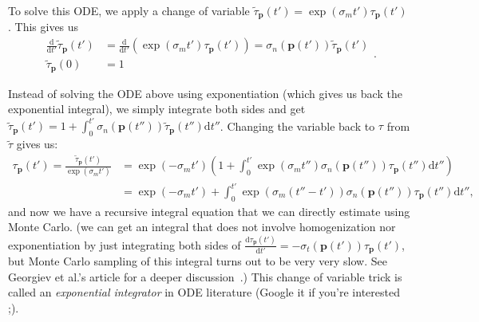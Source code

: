 To solve this ODE, we apply a change of variable $\tilde{\tau}_{\mathbf{p}}(t') = \exp\left(\sigma_m t'\right) \tau_{\mathbf{p}}(t')$. This gives us
\begin{equation}
\begin{aligned}
\frac{\mathrm{d}}{\mathrm{d}t'}\tilde{\tau}_{\mathbf{p}}(t') &= \frac{\mathrm{d}}{\mathrm{d}t'}\left(\exp\left(\sigma_m t'\right) \tau_{\mathbf{p}}(t')\right) = \sigma_n(\mathbf{p}(t')) \tilde{\tau}_{\mathbf{p}}(t') \\
\tilde{\tau}_{\mathbf{p}}(0) &= 1
\end{aligned}.
\end{equation}

Instead of solving the ODE above using exponentiation (which gives us back the exponential integral), we simply integrate both sides and get $\tilde{\tau}_{\mathbf{p}}(t') = 1 + \int_0^{t'} \sigma_n(\mathbf{p}(t'')) \tilde{\tau}_{\mathbf{p}}(t'') \mathrm{d}t''$. Changing the variable back to $\tau$ from $\tilde{\tau}$ gives us:
\begin{equation}
\begin{aligned}
\tau_{\mathbf{p}}(t') = \frac{\tilde{\tau}_{\mathbf{p}}(t')}{\exp\left(\sigma_m t'\right)} &= \exp\left(-\sigma_m t'\right) \left(1 + \int_{0}^{t'} \exp\left(\sigma_m t''\right) \sigma_n(\mathbf{p}(t'')) \tau_{\mathbf{p}}(t'') \mathrm{d}t'' \right) \\
&= \exp\left(-\sigma_m t'\right) + \int_{0}^{t'} \exp\left(\sigma_m (t''-t')\right) \sigma_n(\mathbf{p}(t'')) \tau_{\mathbf{p}}(t'') \mathrm{d}t'',
\end{aligned}
\label{eq:transmittance_recursive_integral}
\end{equation}
and now we have a recursive integral equation that we can directly estimate using Monte Carlo. (we can get an integral that does not involve homogenization nor exponentiation by just integrating both sides of $\frac{\mathrm{d}\tau_\mathbf{p}\left(t'\right)}{\mathrm{d}t'} = -\sigma_t(\mathbf{p}(t'))\tau_\mathbf{p}\left(t'\right)$, but Monte Carlo sampling of this integral turns out to be very very slow. See Georgiev et al.'s article for a deeper discussion~\cite{Georgiev:2019:IFV}.) This change of variable trick is called an \emph{exponential integrator} in ODE literature (Google it if you're interested ;).

